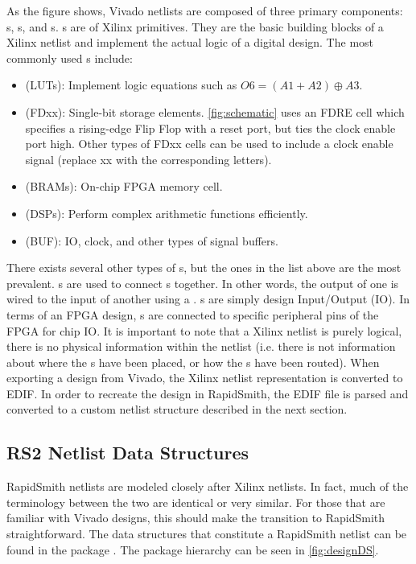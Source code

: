 As the figure shows, Vivado netlists are composed of three primary components:
s, s, and s. s are  of
Xilinx primitives. They are the basic building blocks of a Xilinx netlist and
implement the actual logic of a digital design. The most commonly used
s include:

\begin{itemize}
  \item {} (LUTs): Implement logic equations such as
  $O6 = (A1 + A2) \oplus A3$.
  \item {} (FDxx): Single-bit storage elements.
  \autoref{fig:schematic} uses an FDRE cell which specifies a rising-edge
  Flip Flop with a reset port, but ties the clock enable port high. Other
  types of FDxx cells can be used to include a clock enable signal (replace xx
  with the corresponding letters).
  \item {} (BRAMs): On-chip FPGA memory cell.
  \item {} (DSPs): Perform complex arithmetic
  functions efficiently.
  \item {} (BUF): IO, clock, and other types of signal buffers. 
\end{itemize}

\noindent
There exists several other types of s, but the ones in the list above
are the most prevalent. s are used to connect s together. In
other words, the output of one  is wired to the input of another
 using a . s are simply design
Input/Output (IO). In terms of an FPGA design, s are connected to
specific peripheral pins of the FPGA for chip IO. It is important to note that
a Xilinx netlist is purely logical, there is no physical information within the
netlist (i.e. there is not information about where the s have been
placed, or how the s have been routed). When exporting a design from
Vivado, the Xilinx netlist representation is converted to EDIF. In order to
recreate the design in RapidSmith, the EDIF file is parsed and converted to a
custom netlist structure described in the next section.

\subsection {RS2 Netlist Data Structures} \label{sec:designDS}

RapidSmith netlists are modeled closely after Xilinx netlists. In fact,
much of the terminology between the two are identical or very similar. For those
that are familiar with Vivado designs, this should make the transition to
RapidSmith straightforward. The data structures that constitute a RapidSmith
netlist can be found in the package .
The package hierarchy can be seen in \autoref{fig:designDS}.

